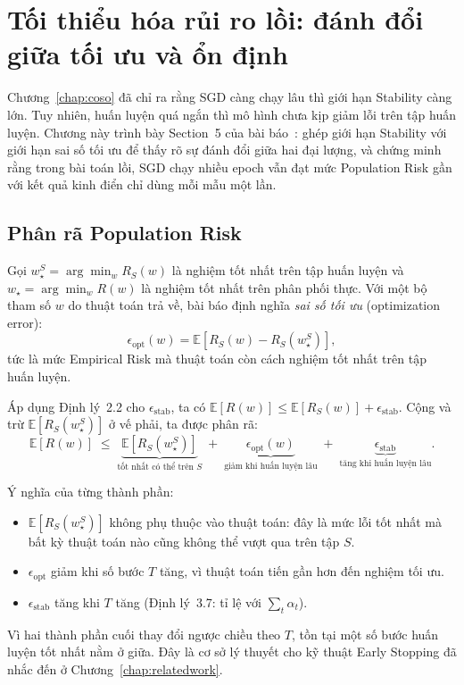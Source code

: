 \chapter{Tối thiểu hóa rủi ro lồi: đánh đổi giữa tối ưu và ổn định}
\label{chap:convexrisk}

Chương~\ref{chap:coso} đã chỉ ra rằng SGD càng chạy lâu thì giới hạn Stability càng lớn. Tuy nhiên, huấn luyện quá ngắn thì mô hình chưa kịp giảm lỗi trên tập huấn luyện. Chương này trình bày Section~5 của bài báo~\cite{hardt2016train}: ghép giới hạn Stability với giới hạn sai số tối ưu để thấy rõ sự đánh đổi giữa hai đại lượng, và chứng minh rằng trong bài toán lồi, SGD chạy nhiều epoch vẫn đạt mức Population Risk gần với kết quả kinh điển chỉ dùng mỗi mẫu một lần.

\section{Phân rã Population Risk}
\label{sec:phanra}

Gọi $w_\star^S = \arg\min_w R_S(w)$ là nghiệm tốt nhất trên tập huấn luyện và $w_\star = \arg\min_w R(w)$ là nghiệm tốt nhất trên phân phối thực. Với một bộ tham số $w$ do thuật toán trả về, bài báo định nghĩa \textit{sai số tối ưu} (optimization error):
\[
\epsilon_{\mathrm{opt}}(w) = \mathbb{E}\left[R_S(w) - R_S(w_\star^S)\right],
\]
tức là mức Empirical Risk mà thuật toán còn cách nghiệm tốt nhất trên tập huấn luyện.

Áp dụng Định lý~2.2 cho $\epsilon_{\mathrm{stab}}$, ta có $\mathbb{E}[R(w)] \le \mathbb{E}[R_S(w)] + \epsilon_{\mathrm{stab}}$. Cộng và trừ $\mathbb{E}[R_S(w_\star^S)]$ ở vế phải, ta được phân rã:
\[
\boxed{
\mathbb{E}\left[R(w)\right] \;\le\; \underbrace{\mathbb{E}\left[R_S(w_\star^S)\right]}_{\text{tốt nhất có thể trên } S} \;+\; \underbrace{\epsilon_{\mathrm{opt}}(w)}_{\text{giảm khi huấn luyện lâu}} \;+\; \underbrace{\epsilon_{\mathrm{stab}}}_{\text{tăng khi huấn luyện lâu}}.
}
\]

Ý nghĩa của từng thành phần:
\begin{itemize}
    \item $\mathbb{E}[R_S(w_\star^S)]$ không phụ thuộc vào thuật toán: đây là mức lỗi tốt nhất mà bất kỳ thuật toán nào cũng không thể vượt qua trên tập $S$.
    \item $\epsilon_{\mathrm{opt}}$ giảm khi số bước $T$ tăng, vì thuật toán tiến gần hơn đến nghiệm tối ưu.
    \item $\epsilon_{\mathrm{stab}}$ tăng khi $T$ tăng (Định lý~3.7: tỉ lệ với $\sum_t \alpha_t$).
\end{itemize}
Vì hai thành phần cuối thay đổi ngược chiều theo $T$, tồn tại một số bước huấn luyện tốt nhất nằm ở giữa. Đây là cơ sở lý thuyết cho kỹ thuật Early Stopping đã nhắc đến ở Chương~\ref{chap:relatedwork}.

